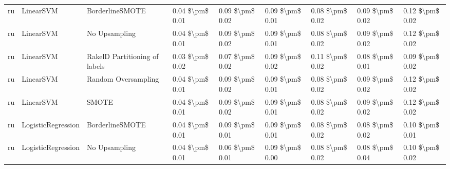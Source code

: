 \begin{tabular}{lllllllll}
      ru &                       LinearSVM &               BorderlineSMOTE & 0.04 \$\textbackslash pm\$ 0.01 &           0.09 \$\textbackslash pm\$ 0.02 &       0.09 \$\textbackslash pm\$ 0.01 &        0.08 \$\textbackslash pm\$ 0.02 &                         0.09 \$\textbackslash pm\$ 0.02 &     0.12 \$\textbackslash pm\$ 0.02 \\
      ru &                       LinearSVM &                 No Upsampling & 0.04 \$\textbackslash pm\$ 0.01 &           0.09 \$\textbackslash pm\$ 0.02 &       0.09 \$\textbackslash pm\$ 0.01 &        0.08 \$\textbackslash pm\$ 0.02 &                         0.09 \$\textbackslash pm\$ 0.02 &     0.12 \$\textbackslash pm\$ 0.02 \\
      ru &                       LinearSVM & RakelD Partitioning of labels & 0.03 \$\textbackslash pm\$ 0.02 &           0.07 \$\textbackslash pm\$ 0.02 &       0.09 \$\textbackslash pm\$ 0.02 &        0.11 \$\textbackslash pm\$ 0.02 &                         0.08 \$\textbackslash pm\$ 0.01 &     0.09 \$\textbackslash pm\$ 0.02 \\
      ru &                       LinearSVM &           Random Oversampling & 0.04 \$\textbackslash pm\$ 0.01 &           0.09 \$\textbackslash pm\$ 0.02 &       0.09 \$\textbackslash pm\$ 0.01 &        0.08 \$\textbackslash pm\$ 0.02 &                         0.09 \$\textbackslash pm\$ 0.02 &     0.12 \$\textbackslash pm\$ 0.02 \\
      ru &                       LinearSVM &                         SMOTE & 0.04 \$\textbackslash pm\$ 0.01 &           0.09 \$\textbackslash pm\$ 0.02 &       0.09 \$\textbackslash pm\$ 0.01 &        0.08 \$\textbackslash pm\$ 0.02 &                         0.09 \$\textbackslash pm\$ 0.02 &     0.12 \$\textbackslash pm\$ 0.02 \\
      ru &              LogisticRegression &               BorderlineSMOTE & 0.04 \$\textbackslash pm\$ 0.01 &           0.09 \$\textbackslash pm\$ 0.01 &       0.09 \$\textbackslash pm\$ 0.01 &        0.08 \$\textbackslash pm\$ 0.02 &                         0.08 \$\textbackslash pm\$ 0.02 &     0.10 \$\textbackslash pm\$ 0.01 \\
      ru &              LogisticRegression &                 No Upsampling & 0.04 \$\textbackslash pm\$ 0.01 &           0.06 \$\textbackslash pm\$ 0.01 &       0.09 \$\textbackslash pm\$ 0.00 &        0.08 \$\textbackslash pm\$ 0.02 &                         0.08 \$\textbackslash pm\$ 0.04 &     0.10 \$\textbackslash pm\$ 0.02 \\

\end{tabular}
